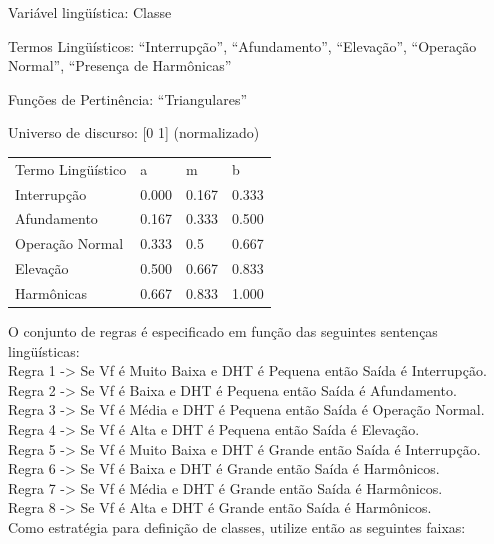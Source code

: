 \documentclass{report}
\begin{document}
Variável lingüística: Classe

Termos Lingüísticos: “Interrupção”, “Afundamento”, “Elevação”, “Operação Normal”, “Presença de Harmônicas”

Funções de Pertinência: “Triangulares”

Universo de discurso: [0 1] (normalizado)


\begin{center}
\begin{tabular}{llll}
Termo Lingüístico & a & m & b\\
Interrupção & 0.000 & 0.167 & 0.333\\
Afundamento & 0.167 & 0.333 & 0.500\\
Operação Normal & 0.333 & 0.5 & 0.667\\
Elevação & 0.500 & 0.667 & 0.833\\
Harmônicas & 0.667 & 0.833 & 1.000
\end{tabular}
\end{center}

O conjunto de regras é especificado em função das seguintes sentenças lingüísticas:\\
Regra 1 -> Se Vf é Muito Baixa e DHT é Pequena então Saída é Interrupção.\\
Regra 2 -> Se Vf é Baixa e DHT é Pequena então Saída é Afundamento.\\
Regra 3 -> Se Vf é Média e DHT é Pequena então Saída é Operação Normal.\\
Regra 4 -> Se Vf é Alta e DHT é Pequena então Saída é Elevação.\\
Regra 5 -> Se Vf é Muito Baixa e DHT é Grande então Saída é Interrupção.\\
Regra 6 -> Se Vf é Baixa e DHT é Grande então Saída é Harmônicos.\\
Regra 7 -> Se Vf é Média e DHT é Grande então Saída é Harmônicos.\\
Regra 8 -> Se  Vf é Alta e  DHT é Grande então Saída é Harmônicos.\\

Como estratégia para definição de classes, utilize então as seguintes faixas:
\end{document}
